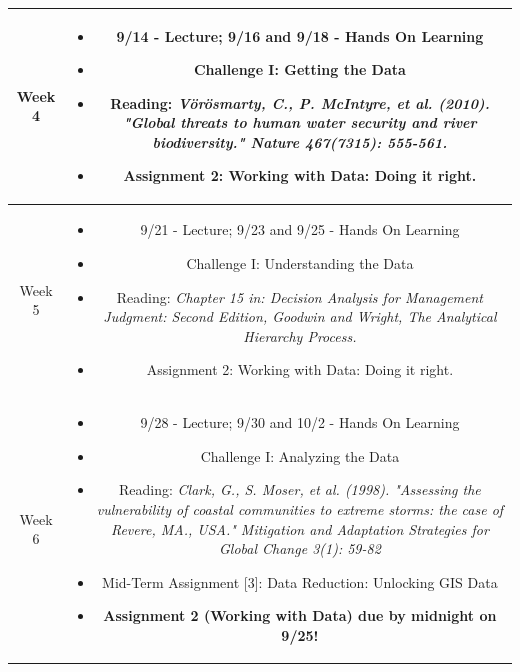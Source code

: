 \documentclass[11pt]{article}
\begin{document}
\begin{table}[h!]
\begin{tabular}{ | c | c | }
Week 4 & \begin{minipage}{.85\textwidth}
\begin{itemize} \itemsep-0.4em
	\vspace{1mm}
	\item 9/14 - Lecture; 9/16 and 9/18 - Hands On Learning
	\item Challenge I: Getting the Data  \item Reading: \textit{Vörösmarty, C., P. McIntyre, et al. (2010). "Global threats to human water security and river biodiversity." Nature 467(7315): 555-561.}
	\item Assignment 2: Working with Data: Doing it right.
	\vspace{1mm}
\end{itemize}
\end{minipage} \\
\hline

Week 5 & \begin{minipage}{.85\textwidth}
\begin{itemize} \itemsep-0.4em
	\vspace{1mm}
	\item 9/21 - Lecture; 9/23 and 9/25 - Hands On Learning
	\item Challenge I: Understanding the Data \item Reading: \textit{Chapter 15 in: Decision Analysis for Management Judgment: Second Edition, Goodwin and Wright, The Analytical Hierarchy Process.}
	\item Assignment 2: Working with Data: Doing it right.
	\vspace{1mm}
\end{itemize}
\end{minipage} \\
\hline


Week 6 & \begin{minipage}{.85\textwidth}
\begin{itemize} \itemsep-0.4em
	\vspace{1mm}
	\item 9/28 - Lecture; 9/30 and 10/2 - Hands On Learning
	\item Challenge I: Analyzing the Data 
	\item Reading: \textit{Clark, G., S. Moser, et al. (1998). "Assessing the vulnerability of coastal communities to extreme  storms: the case of Revere, MA., USA." Mitigation and Adaptation 
Strategies for Global Change 3(1): 59-82}
	\item Mid-Term Assignment [3]: Data Reduction: Unlocking GIS Data
	\item \textbf{Assignment 2 (Working with Data) due by midnight on 9/25!}
	\vspace{1mm}
\end{itemize}
\end{minipage} \\
\hline


\end{tabular}
\end{table}
\end{document}
